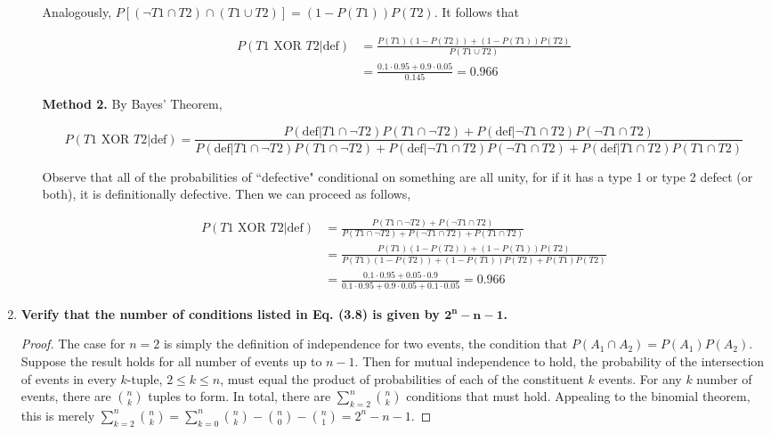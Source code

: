 \documentclass[10pt, oneside]{article}   	%
\theoremstyle{definition}
\begin{document}
\begin{enumerate}[label=3.\arabic*]
\begin{enumerate}
	Analogously, $P [ (\neg T1 \cap T2) \cap (T1 \cup T2) ] = (1 - P(T1))P(T2)$. It follows that
	
	\begin{align*}
	P(T1 \text{ XOR } T2 | \text{def}) &= \frac{P(T1)(1 - P(T2)) + (1 - P(T1))P(T2)}{P(T1 \cup T2)} \\
	&= \frac{0.1 \cdot 0.95 + 0.9 \cdot 0.05}{0.145} = \boxed{0.966} 
	\end{align*}
	
	\textbf{Method 2.} By Bayes' Theorem,
	
	\[ P(T1 \text{ XOR } T2 | \text{def}) = \frac{P(\text{def} | T1 \cap \neg T2) P(T1 \cap \neg T2) + P(\text{def} | \neg T1 \cap T2) P(\neg T1 \cap T2)}{ P(\text{def} | T1 \cap \neg T2) P(T1 \cap \neg T2) + P(\text{def} | \neg T1 \cap T2) P(\neg T1 \cap T2) + P(\text{def} | T1 \cap T2) P(T1 \cap T2) } \]
	
	Observe that all of the probabilities of ``defective" conditional on something are all unity, for if it has a type 1 or type 2 defect (or both), it is definitionally defective. Then we can proceed as follows,
	
	\begin{align*}
	P(T1 \text{ XOR } T2 | \text{def}) &= \frac{ P(T1 \cap \neg T2) + P(\neg T1 \cap T2)}{ P(T1 \cap \neg T2) + P(\neg T1 \cap T2) + P(T1 \cap T2) } \\
	&= \frac{P(T1) (1 - P(T2)) + (1 - P(T1)) P(T2) }{P(T1) (1 - P(T2)) + (1 - P(T1)) P(T2) + P(T1) P(T2)} \\
	&= \frac{0.1 \cdot 0.95 + 0.05 \cdot 0.9}{0.1 \cdot 0.95 + 0.9 \cdot 0.05 + 0.1 \cdot 0.05} = \boxed{0.966} 
	\end{align*}
	
	\end{enumerate}

\item  \begin{tcolorbox}[
  colback=Cerulean!5!white,
  colframe=Cerulean!75!black]
\textbf{Verify that the number of conditions listed in Eq. (3.8) is given by $\bm{2^n - n - 1}$.}
\end{tcolorbox}

\begin{proof} The case for $n=2$ is simply the definition of independence for two events, the condition that $P(A_1 \cap A_2) = P(A_1) P(A_2)$. Suppose the result holds for all number of events up to $n-1$. Then for mutual independence to hold, the probability of the intersection of events in every $k$-tuple, $2 \leq k \leq n$, must equal the product of probabilities of each of the constituent $k$ events. For any $k$ number of events, there are $\binom{n}{k}$ tuples to form. In total, there are $\sum^n_{k=2} \binom{n}{k}$ conditions that must hold. Appealing to the binomial theorem, this is merely $\sum^n_{k=2} \binom{n}{k} = \sum^n_{k = 0} \binom{n}{k} - \binom{n}{0} - \binom{n}{1} = \boxed{2^n - n - 1}$. 
\end{proof}


\end{enumerate}
\end{document}

